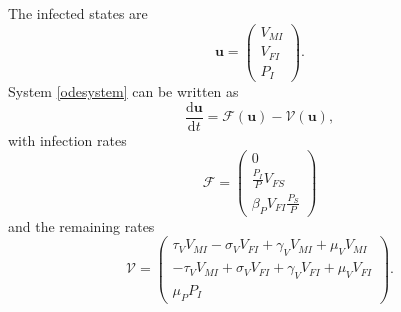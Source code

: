 \documentclass{article}
\newcommand{\md}{\mathrm{d}}
\renewcommand{\vec}[1]{\mathbf{#1}}
\begin{document}
The infected states are
\begin{equation}
  \vec{u} =
  \begin{pmatrix}
    V_{MI} \\ V_{FI} \\ P_I
  \end{pmatrix}.
\end{equation}
System \eqref{odesystem} can be written as
\begin{equation}
  \frac{\md \vec{u}}{\md t} =
  \mathcal{F}(\vec{u})
  - \mathcal{V}(\vec{u}),
\end{equation}
with infection rates
\begin{equation}
  \label{scriptF}
  \mathcal{F} =
  \begin{pmatrix}
    0
    \\
    \frac{P_I}{P} V_{FS}
    \\
    \beta_P V_{FI} \frac{P_S}{P}
  \end{pmatrix}
\end{equation}
and the remaining rates
\begin{equation}
  \label{scriptV}
  \mathcal{V} =
  \begin{pmatrix}
    \tau_V V_{MI} - \sigma_V V_{FI} + \gamma_V V_{MI} + \mu_V V_{MI}
    \\
    - \tau_V V_{MI} + \sigma_V V_{FI} + \gamma_V V_{FI} + \mu_V V_{FI}
    \\
    \mu_P P_I
  \end{pmatrix}.
\end{equation}
\end{document}
